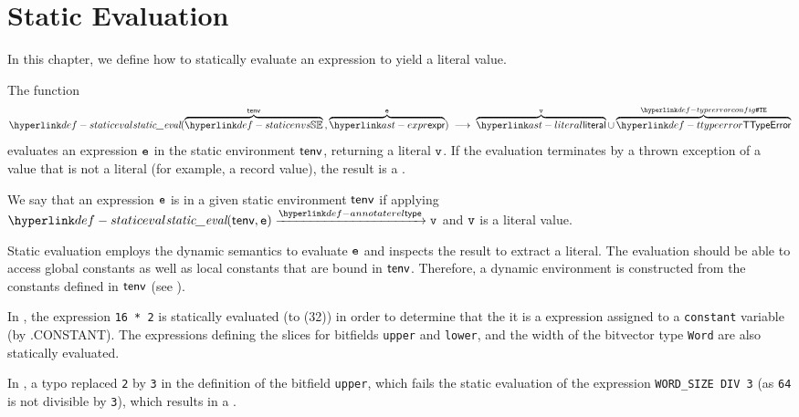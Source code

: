 \chapter{Static Evaluation\label{chap:StaticEvaluation}}

In this chapter, we define how to statically evaluate an expression
to yield a literal value.

\hypertarget{def-staticeval}{}
The function
\[
  \staticeval(\overname{\staticenvs}{\tenv} \aslsep \overname{\expr}{\ve}) \;\aslto\;
  \overname{\literal}{\vv} \cup
  \overname{\TTypeError}{\TypeErrorConfig}
\]
evaluates an expression $\texttt{e}$
in the static environment $\textsf{tenv}$, returning a literal $\texttt{v}$.
If the evaluation terminates by a thrown exception of a value that is not a literal
(for example, a record value), the result is a \typingerrorterm{}.

\hypertarget{def-staticallyevaluable}{}
We say that an expression $\texttt{e}$ is \staticallyevaluable{} in a given static environment $\textsf{tenv}$ if
applying $\staticeval(\tenv, \ve) \typearrow \vv$ and $\texttt{v}$ is a literal value.

Static evaluation employs the dynamic semantics to evaluate $\texttt{e}$ and inspects the result to extract
a literal. The evaluation should be able to access global constants as well as local constants that
are bound in $\textsf{tenv}$. Therefore, a dynamic environment is constructed from the constants defined in $\textsf{tenv}$
(see ).

In , the expression \verb|16 * 2| is statically evaluated
(to \lint(32)) in order to determine that the it is a \staticallyevaluable{} expression
assigned to a \verb|constant| variable (by .CONSTANT).
The expressions defining the slices for bitfields \verb|upper| and \verb|lower|,
and the width of the bitvector type \verb|Word| are also statically evaluated.

In , a typo replaced \verb|2| by \verb|3| in the definition
of the bitfield \verb|upper|, which fails the static evaluation of the expression \verb|WORD_SIZE DIV 3|
(as \verb|64| is not divisible by \verb|3|), which results in a \typingerrorterm.

